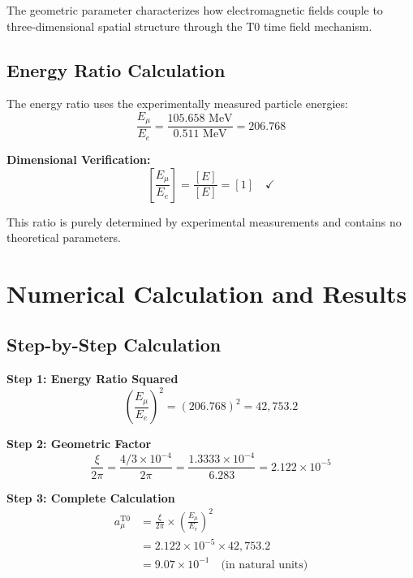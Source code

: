 \documentclass[12pt,a4paper]{report}
\begin{document}
	The geometric parameter characterizes how electromagnetic fields couple to three-dimensional spatial structure through the T0 time field mechanism.
	
	\subsection{Energy Ratio Calculation}
	\label{subsec:energy_ratio_calculation}
	
	The energy ratio uses the experimentally measured particle energies:
	\begin{equation}
		\frac{E_\mu}{E_e} = \frac{105.658 \text{ MeV}}{0.511 \text{ MeV}} = 206.768
	\end{equation}
	
	\textbf{Dimensional Verification:}
	\begin{equation}
		\left[\frac{E_\mu}{E_e}\right] = \frac{[E]}{[E]} = [1] \quad \checkmark
	\end{equation}
	
	This ratio is purely determined by experimental measurements and contains no theoretical parameters.
	
	\section{Numerical Calculation and Results}
	\label{sec:numerical_calculation}
	
	\subsection{Step-by-Step Calculation}
	\label{subsec:step_by_step_calculation}
	
	\textbf{Step 1: Energy Ratio Squared}
	\begin{equation}
		\left(\frac{E_\mu}{E_e}\right)^2 = (206.768)^2 = 42,753.2
	\end{equation}
	
	\textbf{Step 2: Geometric Factor}
	\begin{equation}
		\frac{\xi}{2\pi} = \frac{4/3 \times 10^{-4}}{2\pi} = \frac{1.3333 \times 10^{-4}}{6.283} = 2.122 \times 10^{-5}
	\end{equation}
	
	\textbf{Step 3: Complete Calculation}
	\begin{align}
		a_\mu^{\text{T0}} &= \frac{\xi}{2\pi} \times \left(\frac{E_\mu}{E_e}\right)^2 \\
		&= 2.122 \times 10^{-5} \times 42,753.2 \\
		&= 9.07 \times 10^{-1} \quad \text{(in natural units)}
	\end{align}
	
\end{document}
